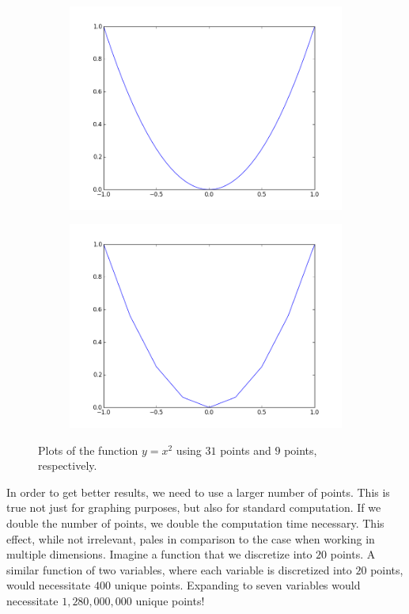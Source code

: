 \begin{center}
\begin{figure}
\begin{subfigure}{.49\textwidth}
\includegraphics[width=\textwidth]{x2.png}
\end{subfigure}
\begin{subfigure}{.49\textwidth}
\includegraphics[width=\textwidth]{x2a.png}
\end{subfigure}
\caption{Plots of the function $y=x^2$ using $31$ points and $9$ points, respectively.}
\label{fig:x_squared}
\end{figure}
\end{center}

In order to get better results, we need to use a larger number of points.  This is true not just for graphing purposes, but also for standard computation.  If we double the number of points, we double the computation time necessary.  This effect, while not irrelevant, pales in comparison to the case when working in multiple dimensions.  Imagine a function that we discretize into $20$ points.  A similar function of two variables, where each variable is discretized into $20$ points, would necessitate $400$ unique points.  Expanding to seven variables would necessitate $1,280,000,000$ unique points!

